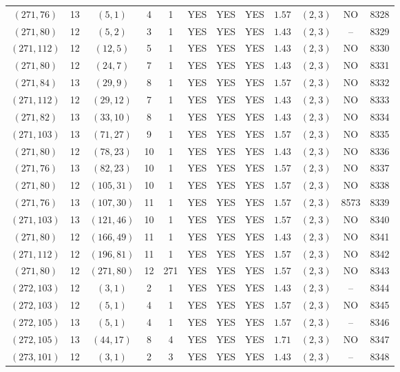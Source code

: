 \begin{longtable}{|c|c|c|c|c|c|c|c|c|c|c|c|}
$(271,76)$ & 13 & $(5,1)$ & 4 & 1 & YES & YES & YES & $1.57$ & $(2,3)$ & NO & 8328\\
$(271,80)$ & 12 & $(5,2)$ & 3 & 1 & YES & YES & YES & $1.43$ & $(2,3)$ & -- & 8329\\
$(271,112)$ & 12 & $(12,5)$ & 5 & 1 & YES & YES & YES & $1.43$ & $(2,3)$ & NO & 8330\\
$(271,80)$ & 12 & $(24,7)$ & 7 & 1 & YES & YES & YES & $1.43$ & $(2,3)$ & NO & 8331\\
$(271,84)$ & 13 & $(29,9)$ & 8 & 1 & YES & YES & YES & $1.57$ & $(2,3)$ & NO & 8332\\
$(271,112)$ & 12 & $(29,12)$ & 7 & 1 & YES & YES & YES & $1.43$ & $(2,3)$ & NO & 8333\\
$(271,82)$ & 13 & $(33,10)$ & 8 & 1 & YES & YES & YES & $1.43$ & $(2,3)$ & NO & 8334\\
$(271,103)$ & 13 & $(71,27)$ & 9 & 1 & YES & YES & YES & $1.57$ & $(2,3)$ & NO & 8335\\
$(271,80)$ & 12 & $(78,23)$ & 10 & 1 & YES & YES & YES & $1.43$ & $(2,3)$ & NO & 8336\\
$(271,76)$ & 13 & $(82,23)$ & 10 & 1 & YES & YES & YES & $1.57$ & $(2,3)$ & NO & 8337\\
$(271,80)$ & 12 & $(105,31)$ & 10 & 1 & YES & YES & YES & $1.57$ & $(2,3)$ & NO & 8338\\
$(271,76)$ & 13 & $(107,30)$ & 11 & 1 & YES & YES & YES & $1.57$ & $(2,3)$ & 8573 & 8339\\
$(271,103)$ & 13 & $(121,46)$ & 10 & 1 & YES & YES & YES & $1.57$ & $(2,3)$ & NO & 8340\\
$(271,80)$ & 12 & $(166,49)$ & 11 & 1 & YES & YES & YES & $1.43$ & $(2,3)$ & NO & 8341\\
$(271,112)$ & 12 & $(196,81)$ & 11 & 1 & YES & YES & YES & $1.57$ & $(2,3)$ & NO & 8342\\
$(271,80)$ & 12 & $(271,80)$ & 12 & 271 & YES & YES & YES & $1.57$ & $(2,3)$ & NO & 8343\\
$(272,103)$ & 12 & $(3,1)$ & 2 & 1 & YES & YES & YES & $1.43$ & $(2,3)$ & -- & 8344\\
$(272,103)$ & 12 & $(5,1)$ & 4 & 1 & YES & YES & YES & $1.57$ & $(2,3)$ & NO & 8345\\
$(272,105)$ & 13 & $(5,1)$ & 4 & 1 & YES & YES & YES & $1.57$ & $(2,3)$ & -- & 8346\\
$(272,105)$ & 13 & $(44,17)$ & 8 & 4 & YES & YES & YES & $1.71$ & $(2,3)$ & NO & 8347\\
$(273,101)$ & 12 & $(3,1)$ & 2 & 3 & YES & YES & YES & $1.43$ & $(2,3)$ & -- & 8348\\

\end{longtable}
